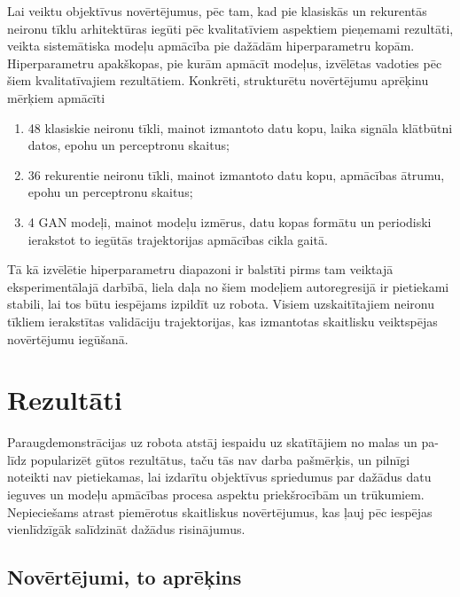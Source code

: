 \documentclass[12pt, a4paper]{article}
\numberwithin{equation}{section} %
\begin{document}
Lai veiktu objektīvus novērtējumus, pēc tam, kad pie klasiskās un rekurentās neironu tīklu arhitektūras iegūti pēc kvalitatīviem aspektiem pieņemami rezultāti, veikta sistemātiska modeļu apmācība pie dažādām hiperparametru kopām. Hiperparametru \linebreak apakškopas, pie kurām apmācīt modeļus, izvēlētas vadoties pēc šiem kvalitatīvajiem rezultātiem. Konkrēti, strukturētu novērtējumu aprēķinu mērķiem apmācīti

\begin{enumerate}
    \item 48 klasiskie neironu tīkli, mainot izmantoto datu kopu, laika signāla klātbūtni datos, epohu un perceptronu skaitus;
    \item 36 rekurentie neironu tīkli, mainot izmantoto datu kopu, apmācības ātrumu, epohu un perceptronu skaitus;
    \item 4 GAN modeļi, mainot modeļu izmērus, datu kopas formātu un periodiski ierakstot to iegūtās trajektorijas apmācības cikla gaitā.
\end{enumerate}

Tā kā izvēlētie hiperparametru diapazoni ir balstīti pirms tam veiktajā eksperimentālajā darbībā, liela daļa no šiem modeļiem autoregresijā ir pietiekami stabili, lai tos būtu iespējams izpildīt uz robota. Visiem uzskaitītajiem neironu tīkliem ierakstītas validāciju trajektorijas, kas izmantotas skaitlisku veiktspējas novērtējumu iegūšanā.

%
%
%
%
%
%
%
%
%
%
%
%
%
%
%
%
%
%
%

\newpage
\section{Rezultāti}

Paraugdemonstrācijas uz robota atstāj iespaidu uz skatītājiem no malas un pa-līdz popularizēt gūtos rezultātus, taču tās nav darba pašmērķis, un pilnīgi noteikti nav pietiekamas, lai izdarītu objektīvus spriedumus par dažādus datu ieguves un modeļu apmācības procesa aspektu priekšrocībām un trūkumiem. Nepieciešams atrast piemērotus skaitliskus novērtējumus, kas ļauj pēc iespējas vienlīdzīgāk salīdzināt dažādus risinājumus.

\subsection{Novērtējumi, to aprēķins}
\end{document}
